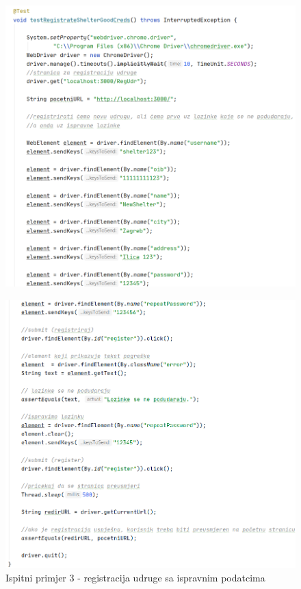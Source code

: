 			 \begin{figure}[H]
			 	\includegraphics[scale=0.75]{slike/Selenium3.1.PNG}
			 	\centering
			 \end{figure}
		 
			 \begin{figure}[H]
			 	\includegraphics[scale=0.75]{slike/Selenium3.2.PNG} %
			 	\caption{Ispitni primjer 3 - registracija udruge sa ispravnim podatcima}
			 	\centering
			 \end{figure}
			 
